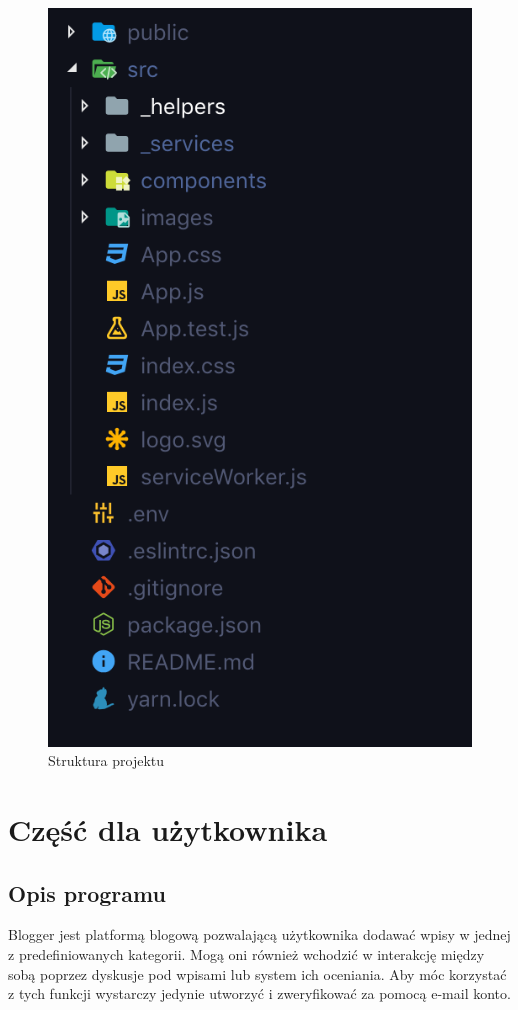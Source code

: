 \documentclass[declaration,shortabstract]{iithesis}
\begin{document}
\begin{figure}
    \centering
    \includegraphics[]{images/forontend.png}  
    \caption{Struktura projektu}
    \label{fig:frontend_struct}
\end{figure}


\chapter{Część dla użytkownika}
\section{Opis programu}
Blogger jest platformą blogową pozwalającą użytkownika dodawać wpisy w jednej z predefiniowanych kategorii. Mogą oni również wchodzić w interakcję między sobą poprzez dyskusje pod wpisami lub system ich oceniania. Aby móc korzystać z tych funkcji wystarczy jedynie utworzyć i zweryfikować za pomocą e-mail konto.
\end{document}
